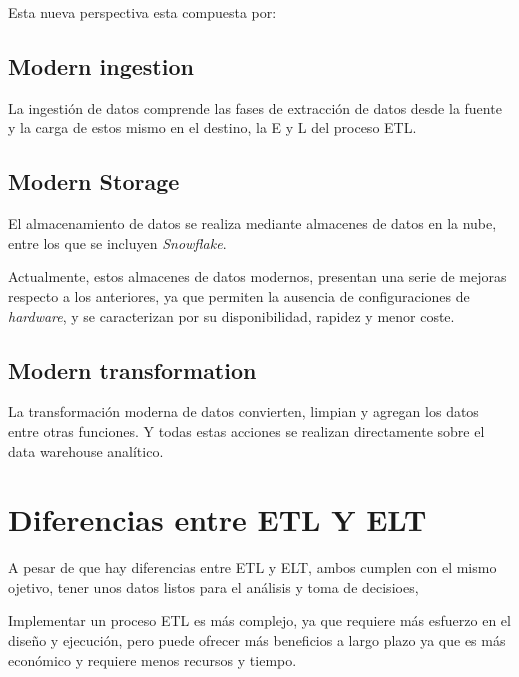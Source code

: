 Esta nueva perspectiva esta compuesta por:

\subsection{Modern ingestion}
La ingestión de datos \cite{Modern} comprende las fases de extracción de datos desde la fuente y la carga de estos mismo en el destino, la E y L del proceso ETL.

\subsection{Modern Storage}
El almacenamiento de datos \cite{Modern} se realiza mediante almacenes de datos en la nube, entre los que se incluyen \emph{Snowflake}.

Actualmente, estos almacenes de datos modernos, presentan una serie de mejoras respecto a los anteriores, ya que permiten la ausencia de configuraciones de \emph{hardware}, y se caracterizan por su disponibilidad, rapidez y menor coste.

\subsection{Modern transformation}
La transformación moderna de datos \cite{Modern} convierten, limpian y agregan los datos entre otras funciones. Y todas estas acciones se realizan directamente sobre el data warehouse analítico.

\section{Diferencias entre ETL Y ELT}

A pesar de que hay diferencias entre ETL y ELT, ambos cumplen con el mismo ojetivo, tener unos datos listos para el análisis y toma de decisioes,

Implementar un proceso ETL es más complejo, ya que requiere más esfuerzo en el diseño y ejecución, pero puede ofrecer más beneficios a largo plazo ya que es más económico y requiere menos recursos y tiempo.

